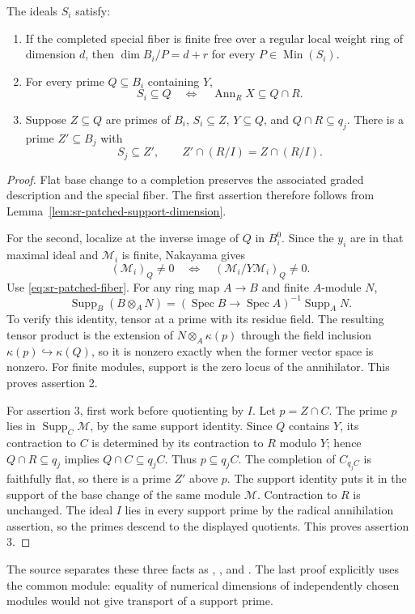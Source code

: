 \begin{srlemma}\label{lem:sr-completed-support}
The ideals $S_i$ satisfy:
\begin{enumerate}
\item If the completed special fiber is finite free over a regular
local weight ring of dimension $d$, then
$\dim B_i/P=d+r$ for every $P\in\operatorname{Min}(S_i)$.
\item For every prime $Q\subseteq B_i$ containing $Y$,
\[
         S_i\subseteq Q
          \quad\Longleftrightarrow\quad
          \operatorname{Ann}_RX\subseteq Q\cap R.
\]
\item Suppose $Z\subseteq Q$ are primes of $B_i$, $S_i\subseteq Z$,
$Y\subseteq Q$, and $Q\cap R\subseteq q_j$.
There is a prime $Z'\subseteq B_j$ with
\[
                       S_j\subseteq Z',
                  \qquad Z'\cap(R/I)=Z\cap(R/I).
\]
\end{enumerate}
\end{srlemma}
\begin{proof}
Flat base change to a completion preserves the associated graded
description and the special fiber. The first assertion therefore
follows from Lemma~\ref{lem:sr-patched-support-dimension}.

For the second, localize at the inverse image of $Q$ in $B_i^0$.
Since the $y_i$ are in that maximal ideal and $\mathcal M_i$ is finite,
Nakayama gives
\[
 (\mathcal M_i)_Q\ne0
        \quad\Longleftrightarrow\quad
      (\mathcal M_i/Y\mathcal M_i)_Q\ne0.
\]
Use \eqref{eq:sr-patched-fiber}.
For any ring map $A\to B$ and finite $A$-module $N$,
\[
     \operatorname{Supp}_B(B\otimes_AN)
              =(\operatorname{Spec}B\to\operatorname{Spec}A)^{-1}
                                      \operatorname{Supp}_AN.
\]
To verify this identity, tensor at a prime with its residue field.
The resulting tensor product is the extension of
$N\otimes_A\kappa(p)$ through the field inclusion
$\kappa(p)\hookrightarrow\kappa(Q)$, so it is nonzero exactly when
the former vector space is nonzero.
For finite modules, support is the zero locus of the annihilator.
This proves assertion 2.

For assertion 3, first work before quotienting by $I$.
Let $p=Z\cap C$.
The prime $p$ lies in $\operatorname{Supp}_C\mathcal M$, by the
same support identity.
Since $Q$ contains $Y$, its contraction to $C$ is determined by
its contraction to $R$ modulo $Y$; hence $Q\cap R\subseteq q_j$
implies $Q\cap C\subseteq q_jC$.
Thus $p\subseteq q_jC$.
The completion of $C_{q_jC}$ is faithfully flat, so there is a prime
$Z'$ above $p$. The support identity puts it in the support of the
base change of the same module $\mathcal M$.
Contraction to $R$ is unchanged.
The ideal $I$ lies in every support prime by the radical annihilation
assertion, so the primes descend to the displayed quotients.
This proves assertion 3.
\end{proof}
The source separates these three facts as
, , and .
The last proof explicitly uses the common module: equality of numerical
dimensions of independently chosen modules would not give transport
of a support prime.

